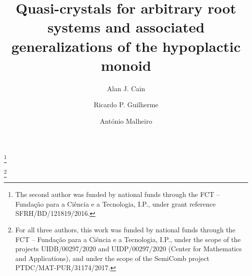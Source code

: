\documentclass[a4paper,reqno]{amsart}
\numberwithin{equation}{section}
\theoremstyle{plain}
\theoremstyle{definition}
\theoremstyle{remark}
\begin{document}
\title[Quasi-crystals for arbitrary root systems]{Quasi-crystals for arbitrary root systems and associated generalizations of the hypoplactic monoid}

\author{Alan J. Cain}
\address{%
Center for Mathematics and Applications (NovaMath)\\
FCT NOVA\\
2829--516 Caparica\\
Portugal
}

\author{Ricardo P. Guilherme}
\address{%
Center for Mathematics and Applications (NovaMath)\\
FCT NOVA\\
and
Department of Mathematics\\
FCT NOVA\\
2829--516 Caparica\\
Portugal
}
\thanks{The second author was funded by national funds through the FCT -- Funda\c{c}\~{a}o para a Ci\^{e}ncia e a Tecnologia, I.P., under grant reference SFRH/BD/121819/2016.}

\author{Ant\'{o}nio Malheiro}
\address{%
Center for Mathematics and Applications (NovaMath)\\
FCT NOVA\\
and
Department of Mathematics\\
FCT NOVA\\
2829--516 Caparica\\
Portugal
}
\thanks{For all three authors, this work was funded by national funds through the FCT -- Funda\c{c}\~{a}o para a Ci\^{e}ncia e a Tecnologia, I.P., under the scope of the projects UIDB/00297/2020 and UIDP/00297/2020 (Center for Mathematics and Applications), and under the scope of the SemiComb project PTDC/MAT-PUR/31174/2017.}
\end{document}
